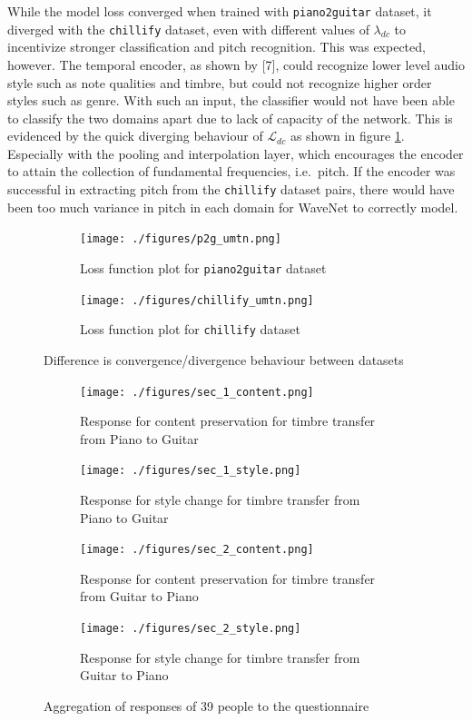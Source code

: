 \documentclass[12pt,a4paper,]{report}
\begin{document}
While the model loss converged when trained with \texttt{piano2guitar}
dataset, it diverged with the \texttt{chillify} dataset, even with
different values of \(\lambda_{dc}\) to incentivize stronger
classification and pitch recognition. This was expected, however. The
temporal encoder, as shown by {[}7{]}, could recognize lower level audio
style such as note qualities and timbre, but could not recognize higher
order styles such as genre. With such an input, the classifier would not
have been able to classify the two domains apart due to lack of capacity
of the network. This is evidenced by the quick diverging behaviour of
\(\mathcal{L}_{dc}\) as shown in figure \ref{fig:umtn_loss}. Especially
with the pooling and interpolation layer, which encourages the encoder
to attain the collection of fundamental frequencies, i.e.~pitch. If the
encoder was successful in extracting pitch from the \texttt{chillify}
dataset pairs, there would have been too much variance in pitch in each
domain for WaveNet to correctly model.

\begin{figure}[]
\begin{subfigure}{.5\textwidth}
  \centering
  \texttt{[image: ./figures/p2g\_umtn.png]}  
  \caption{Loss function plot for \texttt{piano2guitar} dataset}
\end{subfigure}
\begin{subfigure}{.5\textwidth}
  \centering
  \texttt{[image: ./figures/chillify\_umtn.png]}  
  \caption{Loss function plot for \texttt{chillify} dataset}
\end{subfigure}
\caption{Difference is convergence/divergence behaviour between datasets}
\label{fig:umtn_loss}
\centering
\end{figure}

\begin{figure}
\begin{subfigure}{.5\textwidth}
  \centering
  \texttt{[image: ./figures/sec\_1\_content.png]}  
  \caption{Response for content preservation for timbre transfer from Piano to Guitar}
\end{subfigure}
\begin{subfigure}{.5\textwidth}
  \centering
  \texttt{[image: ./figures/sec\_1\_style.png]}  
  \caption{Response for style change for timbre transfer from Piano to Guitar}
\end{subfigure}
\begin{subfigure}{.5\textwidth}
  \centering
  \texttt{[image: ./figures/sec\_2\_content.png]}  
  \caption{Response for content preservation for timbre transfer from Guitar to Piano}
\end{subfigure}
\begin{subfigure}{.5\textwidth}
  \centering
  \texttt{[image: ./figures/sec\_2\_style.png]}  
\caption{Response for style change for timbre transfer from Guitar to Piano} \label{fig:guitarstyle}
\end{subfigure}
\caption{Aggregation of responses of 39 people to the questionnaire} \label{fig:responses}
\centering
\end{figure}
\end{document}
